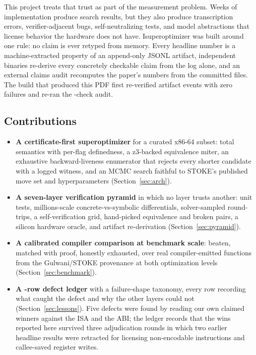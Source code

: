 \documentclass[journal,10pt]{IEEEtran}
\begin{document}
This project treats that trust as part of the measurement problem.
Weeks of implementation produce search results, but they also produce
transcription errors, verifier-adjacent bugs, self-neutralizing tests,
and model abstractions that license behavior the hardware does not
have. Isuperoptimizer was built around one rule: no claim is ever
retyped from memory. Every headline number is a machine-extracted
property of an append-only JSONL artifact, independent binaries
re-derive every concretely checkable claim from the log alone, and an
external claims audit recomputes the paper's numbers from the committed
files. The build that produced this PDF first re-verified
\RecheckTotal{} artifact events with zero failures and re-ran the
\AuditChecks{}-check audit.

\subsection{Contributions}
\begin{itemize}
\item \textbf{A certificate-first superoptimizer} for a curated
x86-64 subset: total semantics with per-flag definedness, a z3-backed
equivalence miter, an exhaustive backward-liveness enumerator that
rejects every shorter candidate with a logged witness, and an MCMC
search faithful to STOKE's published move set and hyperparameters
\cite{stoke13} (Section~\ref{sec:arch}).
\item \textbf{A seven-layer verification pyramid} in which no layer
trusts another: unit tests, millions-scale concrete-vs-symbolic
differentials, solver-sampled round-trips, a self-verification grid,
hand-picked equivalence and broken pairs, a silicon hardware oracle,
and artifact re-derivation (Section~\ref{sec:pyramid}).
\item \textbf{A calibrated compiler comparison at benchmark scale}:
\NumBeaten{} beaten, \NumMatched{} matched with proof, \NumHonest{}
honestly exhausted, over \NumFunctions{} real compiler-emitted
functions from the Gulwani/STOKE provenance \cite{gulwani11,stoke13}
at both optimization levels (Section~\ref{sec:benchmark}).
\item \textbf{A \NumLedgerRows{}-row defect ledger} with a
failure-shape taxonomy, every row recording what caught the defect and
why the other layers could not (Section~\ref{sec:lessons}). Five
defects were found by reading our own claimed winners against the ISA
and the ABI; the ledger records that the wins reported here survived
three adjudication rounds in which two earlier headline results were
retracted for licensing non-encodable instructions and callee-saved
register writes.
\end{itemize}
\end{document}
